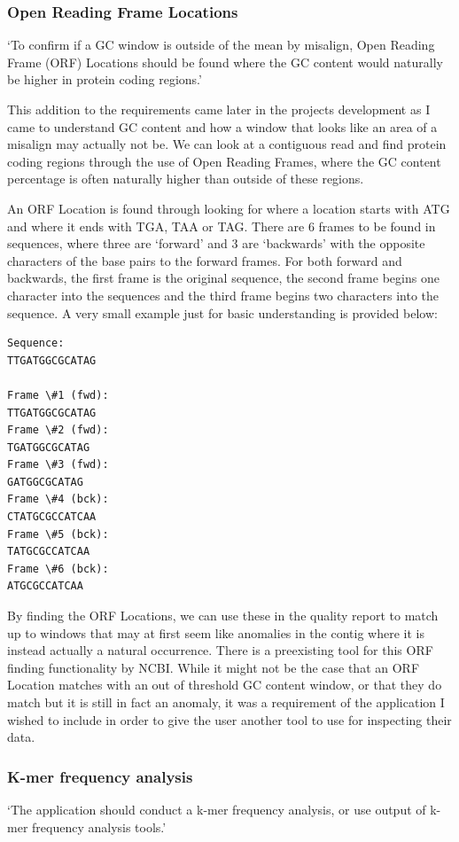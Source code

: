 \subsubsection{Open Reading Frame Locations}
`To confirm if a GC window is outside of the mean by misalign, Open Reading Frame (ORF) Locations should be found where the GC content would naturally be higher in protein coding regions.'

This addition to the requirements came later in the projects development as I came to understand GC content and how a window that looks like an area of a misalign may actually not be. We can look at a contiguous read and find protein coding regions through the use of Open Reading Frames\cite{orfdefinition}, where the GC content percentage is often naturally higher than outside of these regions.

An ORF Location is found through looking for where a location starts with ATG and where it ends with TGA, TAA or TAG. There are 6 frames to be found in sequences, where three are `forward' and 3 are `backwards' with the opposite characters of the base pairs to the forward frames. For both forward and backwards, the first frame is the original sequence, the second frame begins one character into the sequences and the third frame begins two characters into the sequence. A very small example just for basic understanding is provided below:

\begin{verbatim}
Sequence:
TTGATGGCGCATAG

Frame \#1 (fwd):
TTGATGGCGCATAG
Frame \#2 (fwd):
TGATGGCGCATAG
Frame \#3 (fwd):
GATGGCGCATAG
Frame \#4 (bck):
CTATGCGCCATCAA
Frame \#5 (bck):
TATGCGCCATCAA
Frame \#6 (bck):
ATGCGCCATCAA
\end{verbatim}

By finding the ORF Locations, we can use these in the quality report to match up to windows that may at first seem like anomalies in the contig where it is instead actually a natural occurrence. There is a preexisting tool for this ORF finding functionality by NCBI\cite{orffinder}. While it might not be the case that an ORF Location matches with an out of threshold GC content window, or that they do match but it is still in fact an anomaly, it was a requirement of the application I wished to include in order to give the user another tool to use for inspecting their data.

\subsubsection{K-mer frequency analysis}
`The application should conduct a k-mer frequency analysis, or use output of k-mer frequency analysis tools.'

